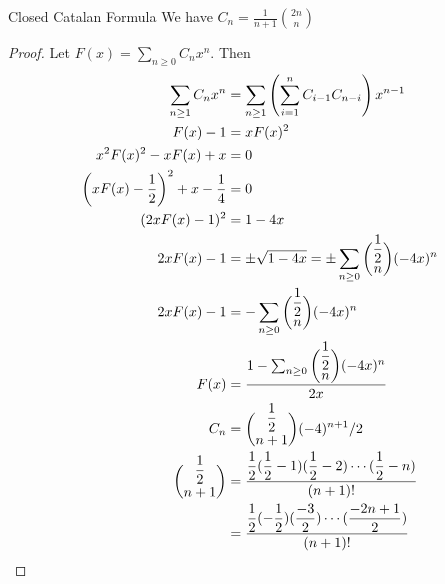 \documentclass{report}
\begin{document}
\begin{theorem}{Closed Catalan Formula}
    We have $C_{n} = \frac{1}{n + 1}\binom{2n}{n}$
\end{theorem}
    \begin{proof}
        Let $F(x) = \sum_{n \geq 0}C_{n}x^{n}$. Then 
             \begin{align*}
                 \sum_{n \geq 1}C_{n}x^{n}                                &= \sum_{n \geq 1}\left(\sum_{i = 1}^{n}C_{i - 1}C_{n - i}\right)x^{n - 1}                      \\
                 F(x) - 1                                                 &= xF(x)^{2}                                                                                    \\
                 x^{2}F(x)^{2} - xF(x) + x                                &= 0                                                                                            \\
                 \left(xF(x) - \dfrac{1}{2}\right)^{2} + x - \dfrac{1}{4} &= 0                                                                                            \\
                 (2xF(x) - 1)^{2}                                         &= 1 - 4x                                                                                       \\
                 2xF(x) - 1                                               &= \pm\sqrt{1 - 4x} = \pm \sum_{n\geq 0}\dbinom{\dfrac{1}{2}}{n}(-4x)^{n}                       \\
                 2xF(x) - 1                                               &= -\sum_{n \geq 0}\dbinom{\dfrac{1}{2}}{n}(-4x)^{n}                                            \\
                 F(x)                                                     &= \dfrac{1 - \sum_{n \geq 0}\dbinom{\dfrac{1}{2}}{n}(-4x)^{n}}{2x}                             \\
                 C_{n}                                                    &= \dbinom{\dfrac{1}{2}}{n + 1}(-4)^{n + 1}/2                                                   \\
                 \dbinom{\dfrac{1}{2}}{n + 1}                             &= \dfrac{\dfrac{1}{2} (\dfrac{1}{2} - 1)(\dfrac{1}{2} - 2)\cdots (\dfrac{1}{2} - n)}{(n + 1)!} \\
                                                                          &= \dfrac{\dfrac{1}{2}(-\dfrac{1}{2})(\dfrac{-3}{2}) \cdots (\dfrac{-2n + 1}{2})}{(n + 1)!}     \\

\end{align*}
\end{proof}
\end{document}
